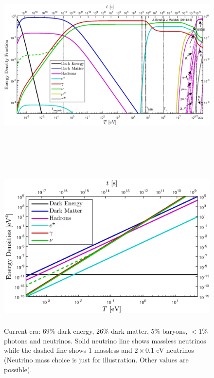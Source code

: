 \documentclass[Universe,article,submit,moreauthors,pdftex]{Definitions/mdpi}
\begin{document}
\begin{figure} 
  \centerline{\hspace*{0.4cm}\includegraphics[height=11cm]{./plots/energy_fractions.eps}}
  \centerline{\hspace*{0.4cm}\includegraphics[height=8.5cm]{./plots/energy_densities.eps}}
  \caption{Current era: $69\%$ dark energy, $26\%$ dark matter, $5\%$ baryons, $<1\%$ photons and neutrinos.  Solid neutrino line shows massless neutrinos while the dashed line shows $1$ massless and $2\times 0.1$ eV neutrinos (Neutrino mass choice is just for illustration.  Other values are possible).\label{fig:energy_frac}}
   \end{figure}
\end{document}
